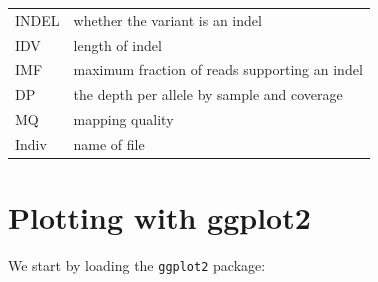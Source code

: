 \documentclass[]{book}
\begin{document}
\begin{longtable}[]{@{}ll@{}}
\begin{minipage}[t]{0.09\columnwidth}\raggedright
INDEL\strut
\end{minipage} & \begin{minipage}[t]{0.85\columnwidth}\raggedright
whether the variant is an indel\strut
\end{minipage}\tabularnewline
\begin{minipage}[t]{0.09\columnwidth}\raggedright
IDV\strut
\end{minipage} & \begin{minipage}[t]{0.85\columnwidth}\raggedright
length of indel\strut
\end{minipage}\tabularnewline
\begin{minipage}[t]{0.09\columnwidth}\raggedright
IMF\strut
\end{minipage} & \begin{minipage}[t]{0.85\columnwidth}\raggedright
maximum fraction of reads supporting an indel\strut
\end{minipage}\tabularnewline
\begin{minipage}[t]{0.09\columnwidth}\raggedright
DP\strut
\end{minipage} & \begin{minipage}[t]{0.85\columnwidth}\raggedright
the depth per allele by sample and coverage\strut
\end{minipage}\tabularnewline
\begin{minipage}[t]{0.09\columnwidth}\raggedright
MQ\strut
\end{minipage} & \begin{minipage}[t]{0.85\columnwidth}\raggedright
mapping quality\strut
\end{minipage}\tabularnewline
\begin{minipage}[t]{0.09\columnwidth}\raggedright
Indiv\strut
\end{minipage} & \begin{minipage}[t]{0.85\columnwidth}\raggedright
name of file\strut
\end{minipage}\tabularnewline
\bottomrule
\end{longtable}

\hypertarget{plotting-with-ggplot2}{%
\section{Plotting with ggplot2}\label{plotting-with-ggplot2}}

We start by loading the \texttt{ggplot2} package:
\end{document}

